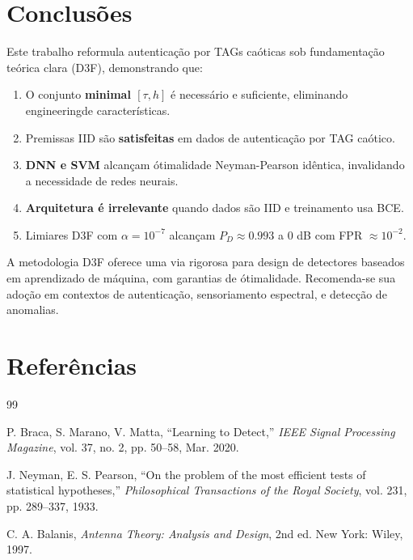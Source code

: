 \documentclass[10pt, a4paper]{article}
\begin{document}
\section{Conclusões}

Este trabalho reformula autenticação por TAGs caóticas sob fundamentação teórica clara (D3F), demonstrando que:

\begin{enumerate}
\item O conjunto \textbf{minimal $[\tau, h]$} é necessário e suficiente, eliminando engineeringde características.
\item Premissas IID são \textbf{satisfeitas} em dados de autenticação por TAG caótico.
\item \textbf{DNN e SVM} alcançam ótimalidade Neyman-Pearson idêntica, invalidando a necessidade de redes neurais.
\item \textbf{Arquitetura é irrelevante} quando dados são IID e treinamento usa BCE.
\item Limiares D3F com $\alpha = 10^{-7}$ alcançam $P_D \approx 0.993$ a 0 dB com FPR $\approx 10^{-2}$.
\end{enumerate}

A metodologia D3F oferece uma via rigorosa para design de detectores baseados em aprendizado de máquina, com garantias de ótimalidade. Recomenda-se sua adoção em contextos de autenticação, sensoriamento espectral, e detecção de anomalias.

\section*{Referências}

\begin{thebibliography}{99}

P. Braca, S. Marano, V. Matta, ``Learning to Detect,'' \textit{IEEE Signal Processing Magazine}, vol. 37, no. 2, pp. 50--58, Mar. 2020.

J. Neyman, E. S. Pearson, ``On the problem of the most efficient tests of statistical hypotheses,'' \textit{Philosophical Transactions of the Royal Society}, vol. 231, pp. 289--337, 1933.

C. A. Balanis, \textit{Antenna Theory: Analysis and Design}, 2nd ed. New York: Wiley, 1997.

\end{thebibliography}

\appendix
\end{document}

